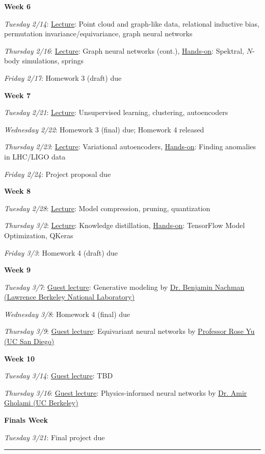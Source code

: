 \documentclass[12pt]{article}
\begin{document}
\noindent\textbf{Week 6}

\emph{Tuesday 2/14}: \underline{Lecture}: Point cloud and graph-like data, relational inductive bias, permutation invariance/equivariance, graph neural networks

\emph{Thursday 2/16}: \underline{Lecture}: Graph neural networks (cont.), \underline{Hands-on}: Spektral, $N$-body simulations, springs

\emph{Friday 2/17}: Homework 3 (draft) due

\noindent\textbf{Week 7}

\emph{Tuesday 2/21}: \underline{Lecture}: Unsupervised learning, clustering, autoencoders

\emph{Wednesday 2/22}: Homework 3 (final) due; Homework 4 released

\emph{Thursday 2/23}: \underline{Lecture}: Variational autoencoders, \underline{Hands-on}: Finding anomalies in LHC/LIGO data

\emph{Friday 2/24}: Project proposal due

\noindent\textbf{Week 8}

\emph{Tuesday 2/28}: \underline{Lecture}: Model compression, pruning, quantization

\emph{Thursday 3/2}: \underline{Lecture}: Knowledge distillation, \underline{Hands-on}: TensorFlow Model Optimization, QKeras

\emph{Friday 3/3}: Homework 4 (draft) due

\noindent\textbf{Week 9}

\emph{Tuesday 3/7}: \underline{Guest lecture}: Generative modeling by \href{https://bids.berkeley.edu/people/benjamin-nachman}{Dr. Benjamin Nachman (Lawrence Berkeley National Laboratory)}

\emph{Wednesday 3/8}: Homework 4 (final) due

\emph{Thursday 3/9}: \underline{Guest lecture}: Equivariant neural networks by \href{https://roseyu.com/}{Professor Rose Yu (UC San Diego)}

\noindent\textbf{Week 10}

\emph{Tuesday 3/14}: \underline{Guest lecture}: TBD

\emph{Thursday 3/16}: \underline{Guest lecture}: Physics-informed neural networks by \href{https://amirgholami.org/}{Dr. Amir Gholami (UC Berkeley)}

\noindent\textbf{Finals Week}

\emph{Tuesday 3/21}: Final project due

\begin{center}
	\rule{\textwidth}{0.5pt}
\end{center}
\end{document}
